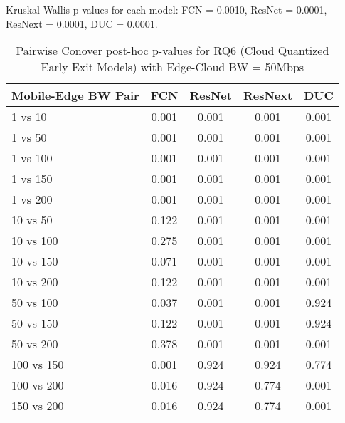 \begin{table}[h]
\centering
\caption{Pairwise Conover post-hoc p-values for RQ6 (Cloud Quantized Early Exit Models) with Edge-Cloud BW = 50Mbps}
\label{tab:conover_cloud_quantized_earlyexit_ec50}
\smallskip
Kruskal-Wallis p-values for each model: FCN = 0.0010, ResNet = 0.0001, ResNext = 0.0001, DUC = 0.0001.

\begin{tabular}{lcccc}
\toprule
Mobile-Edge BW Pair & FCN & ResNet & ResNext & DUC \\
\midrule
1 vs 10 & 0.001 & 0.001 & 0.001 & 0.001 \\
1 vs 50 & 0.001 & 0.001 & 0.001 & 0.001 \\
1 vs 100 & 0.001 & 0.001 & 0.001 & 0.001 \\
1 vs 150 & 0.001 & 0.001 & 0.001 & 0.001 \\
1 vs 200 & 0.001 & 0.001 & 0.001 & 0.001 \\
10 vs 50 & 0.122 & 0.001 & 0.001 & 0.001 \\
10 vs 100 & 0.275 & 0.001 & 0.001 & 0.001 \\
10 vs 150 & 0.071 & 0.001 & 0.001 & 0.001 \\
10 vs 200 & 0.122 & 0.001 & 0.001 & 0.001 \\
50 vs 100 & 0.037 & 0.001 & 0.001 & 0.924 \\
50 vs 150 & 0.122 & 0.001 & 0.001 & 0.924 \\
50 vs 200 & 0.378 & 0.001 & 0.001 & 0.001 \\
100 vs 150 & 0.001 & 0.924 & 0.924 & 0.774 \\
100 vs 200 & 0.016 & 0.924 & 0.774 & 0.001 \\
150 vs 200 & 0.016 & 0.924 & 0.774 & 0.001 \\
\bottomrule
\end{tabular}
\end{table}

